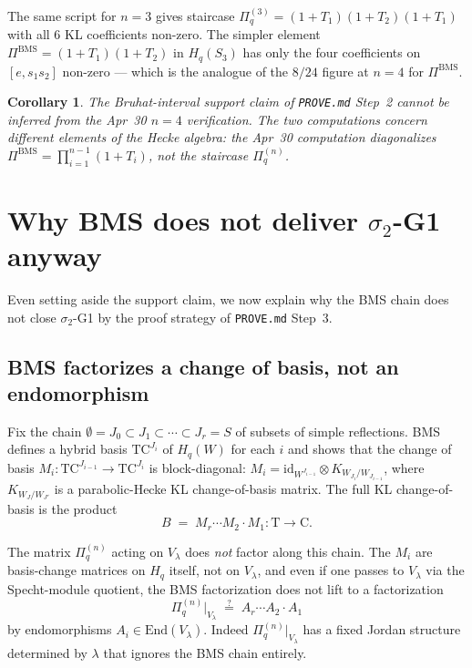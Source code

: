 \documentclass{article}
\newtheorem{corollary}[theorem]{Corollary}
\theoremstyle{definition}
\begin{document}
\medskip
The same script for $n=3$ gives staircase
$\Pi_q^{(3)} = (1+T_1)(1+T_2)(1+T_1)$ with all $6$ KL coefficients
non-zero. The simpler element $\Pi^{\text{BMS}} = (1+T_1)(1+T_2)$ in
$H_q(S_3)$ has only the four coefficients on $[e, s_1 s_2]$ non-zero
--- which is the analogue of the $8/24$ figure at $n=4$ for $\Pi^{\text{BMS}}$.

\begin{corollary}\label{cor:no-bruhat-bound}
The Bruhat-interval support claim of \texttt{PROVE.md} Step~2 cannot
be inferred from the Apr~30 $n=4$ verification. The two computations
concern different elements of the Hecke algebra: the Apr~30
computation diagonalizes $\Pi^{\text{BMS}} = \prod_{i=1}^{n-1}(1+T_i)$,
\emph{not} the staircase $\Pi_q^{(n)}$.
\end{corollary}

\section{Why BMS does not deliver $\sigma_2$-G1 anyway}

Even setting aside the support claim, we now explain why the BMS
chain does not close $\sigma_2$-G1 by the proof strategy of
\texttt{PROVE.md} Step~3.

\subsection{BMS factorizes a change of basis, not an endomorphism}

Fix the chain
$\emptyset = J_0 \subset J_1 \subset \cdots \subset J_r = S$ of subsets
of simple reflections. BMS defines a hybrid basis $\mathrm{TC}^{J_i}$
of $H_q(W)$ for each $i$ and shows that the change of basis
$M_i: \mathrm{TC}^{J_{i-1}} \to \mathrm{TC}^{J_i}$ is block-diagonal:
$M_i = \mathrm{id}_{W^{J_{i-1}}} \otimes K_{W_{J_i}/W_{J_{i-1}}}$,
where $K_{W_{J}/W_{J'}}$ is a parabolic-Hecke KL change-of-basis matrix.
The full KL change-of-basis is the product
\[
B \;=\; M_r \cdots M_2 \cdot M_1 : \mathrm{T} \longrightarrow \mathrm{C}.
\]

The matrix $\Pi_q^{(n)}$ acting on $V_\lambda$ does \emph{not} factor
along this chain. The $M_i$ are basis-change matrices on $H_q$
itself, not on $V_\lambda$, and even if one passes to $V_\lambda$ via
the Specht-module quotient, the BMS factorization does not lift to a
factorization
\[
\Pi_q^{(n)}|_{V_\lambda} \;\stackrel{?}{=}\; A_r \cdots A_2 \cdot A_1
\]
by endomorphisms $A_i \in \mathrm{End}(V_\lambda)$. Indeed
$\Pi_q^{(n)}|_{V_\lambda}$ has a fixed Jordan structure determined by
$\lambda$ that ignores the BMS chain entirely.
\end{document}
